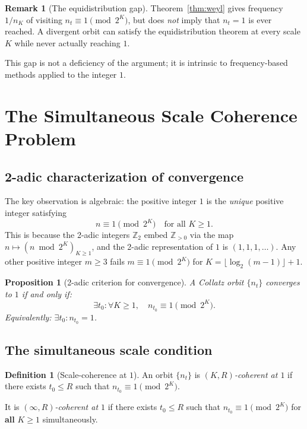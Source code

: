 \documentclass[12pt]{article}
\newtheorem{proposition}[theorem]{Proposition}
\theoremstyle{definition}
\newtheorem{definition}[theorem]{Definition}
\newtheorem{remark}[theorem]{Remark}
\begin{document}
\begin{remark}[The equidistribution gap]
Theorem~\ref{thm:weyl} gives frequency $1/n_K$ of visiting $n_t \equiv 1 \pmod{2^K}$, but does \emph{not} imply that $n_t = 1$ is ever reached. A divergent orbit can satisfy the equidistribution theorem at every scale $K$ while never actually reaching $1$.
\end{remark}

This gap is not a deficiency of the argument; it is intrinsic to frequency-based methods applied to the integer $1$.

\section{The Simultaneous Scale Coherence Problem}
\label{sec:ssc}

\subsection{2-adic characterization of convergence}

The key observation is algebraic: the positive integer $1$ is the \emph{unique} positive integer satisfying
\[
  n \equiv 1 \pmod{2^K} \quad\text{for all } K \geq 1.
\]
This is because the 2-adic integers $\mathbb{Z}_2$ embed $\mathbb{Z}_{>0}$ via the map $n \mapsto (n \bmod 2^K)_{K \geq 1}$, and the 2-adic representation of $1$ is $(1, 1, 1, \ldots)$. Any other positive integer $m \geq 3$ fails $m \equiv 1 \pmod{2^K}$ for $K = \lfloor \log_2(m-1) \rfloor + 1$.

\begin{proposition}[2-adic criterion for convergence]
\label{prop:2adic}
A Collatz orbit $\{n_t\}$ converges to $1$ if and only if:
\[
  \exists t_0 : \forall K \geq 1,\quad n_{t_0} \equiv 1 \pmod{2^K}.
\]
Equivalently: $\exists t_0 : n_{t_0} = 1$.
\end{proposition}

\subsection{The simultaneous scale condition}

\begin{definition}[Scale-coherence at $1$]
An orbit $\{n_t\}$ is \emph{$(K,R)$-coherent at $1$} if there exists $t_0 \leq R$ such that $n_{t_0} \equiv 1 \pmod{2^K}$.

It is \emph{$(\infty,R)$-coherent at $1$} if there exists $t_0 \leq R$ such that $n_{t_0} \equiv 1 \pmod{2^K}$ for \textbf{all} $K \geq 1$ simultaneously.
\end{definition}
\end{document}
